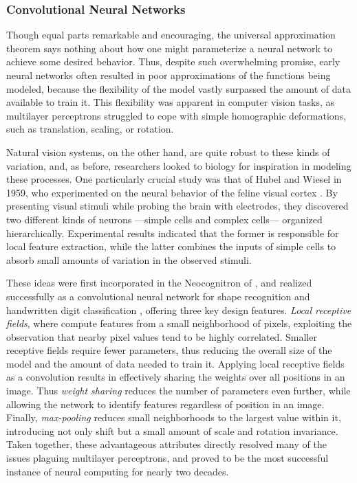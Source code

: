 \subsubsection{Convolutional Neural Networks}
\label{subsec:convnets}


Though equal parts remarkable and encouraging, the universal approximation theorem says nothing about how one might parameterize a neural network to achieve some desired behavior.
Thus, despite such overwhelming promise, early neural networks often resulted in poor approximations of the functions being modeled, because the flexibility of the model vastly surpassed the amount of data available to train it.
This flexibility was apparent in computer vision tasks, as multilayer perceptrons struggled to cope with simple homographic deformations, such as translation, scaling, or rotation.

Natural vision systems, on the other hand, are quite robust to these kinds of variation, and, as before, researchers looked to biology for inspiration in modeling these processes.
One particularly crucial study was that of Hubel and Wiesel in 1959, who experimented on the neural behavior of the feline visual cortex \cite{}.
By presenting visual stimuli while probing the brain with electrodes, they discovered two different kinds of neurons ---simple cells and complex cells--- organized hierarchically.
Experimental results indicated that the former is responsible for local feature extraction, while the latter combines the inputs of simple cells to absorb small amounts of variation in the observed stimuli.

These ideas were first incorporated in the Neocognitron of \cite{Fukushima1988}, and realized successfully as a convolutional neural network for shape recognition and handwritten digit classification \cite{LeCun1990, LeCun1998},  offering three key design features.
\emph{Local receptive fields}, where compute features from a small neighborhood of pixels, exploiting the observation that nearby pixel values tend to be highly correlated.
Smaller receptive fields require fewer parameters, thus reducing the overall size of the model and the amount of data needed to train it.
Applying local receptive fields as a convolution results in effectively sharing the weights over all positions in an image.
Thus \emph{weight sharing} reduces the number of parameters even further, while allowing the network to identify features regardless of position in an image.
Finally, \emph{max-pooling} reduces small neighborhoods to the largest value within it, introducing not only shift but a small amount of scale and rotation invariance.
Taken together, these advantageous attributes directly resolved many of the issues plaguing multilayer perceptrons, and proved to be the most successful instance of neural computing for nearly two decades.


